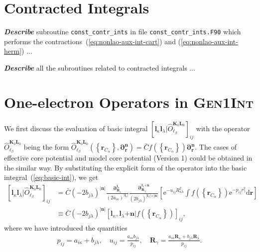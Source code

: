 \documentclass[a4paper,11pt,twoside,openright]{book}
\newcommand{\fixme}[1]{\textbf{\textit{\color{red} #1}}}
\begin{document}
\section{Contracted Integrals}
\label{sect:contr-ints}

\fixme{Describe} subroutine \verb|const_contr_ints| in file \verb|const_contr_ints.F90| which performs the
contractions~(\ref{eq:nonlao-aux-int-cart}) and (\ref{eq:nonlao-aux-int-herm}) ...

\fixme{Describe} all the subroutines related to contracted integrals ...

\section{One-electron Operators in \textsc{Gen1Int}}
\label{sect:operators}

We first discuss the evaluation of basic integral $\left[\boldsymbol{l}_{\kappa}\boldsymbol{l}_{\lambda}\Big|%
\hat{O}_{\ell_{\beta}}^{\boldsymbol{K}_{0}\boldsymbol{L}_{0}}\right]_{ij}$ with the operator
$\hat{O}_{\ell_{\beta}}^{\boldsymbol{K}_{0}\boldsymbol{L}_{0}}$ being the form
$\hat{O}_{\ell_{\beta}}^{\boldsymbol{K}_{0}\boldsymbol{L}_{0}}%
\left(\left\{\boldsymbol{r}_{C_{\alpha}}\right\},\boldsymbol{\partial_{r}^{n}}\right)
=\bar{C}f\left(\left\{\boldsymbol{r}_{C_{\alpha}}\right\}\right)\boldsymbol{\partial}_{\boldsymbol{r}}^{\boldsymbol{n}}$.
The cases of effective core potential and model core potential (Version 1) could be
obtained in the similar way. By substituting the explicit form of the operator into the basic integral~(\ref{eq:basic-int}),
we get~\cite{Gao:IJQC:2010,bgkrth-a,bgkr}
\begin{align}
  \left[\boldsymbol{l}_{\kappa}\boldsymbol{l}_{\lambda}\Big|%
    \hat{O}_{\ell_{\beta}}^{\boldsymbol{K}_{0}\boldsymbol{L}_{0}}\right]_{ij}
  &=\bar{C}(-2b_{j\lambda})^{|\boldsymbol{n}|}%
    \frac{\boldsymbol{\partial}_{\boldsymbol{R}_{\kappa}}^{\boldsymbol{l}_{\kappa}}}%
      {(2a_{i\kappa})^{|\boldsymbol{l}_{\kappa}|}}%
    \frac{\boldsymbol{\partial}_{\boldsymbol{R}_{\lambda}}^{\boldsymbol{l}_{\lambda}\mathrm{+}\boldsymbol{n}}}%
      {(2b_{j\lambda})^{|\boldsymbol{l}_{\lambda}|\mathrm{+}|\boldsymbol{n}|}}%
    \left[\mathrm{e}^{-u_{ij}R_{\kappa\lambda}^2}\int%
      f\left(\left\{\boldsymbol{r}_{C_{\alpha}}\right\}\right)%
        \mathrm{e}^{-p_{ij}r_{\gamma}^2}\mathrm{d}\boldsymbol{r}\right]\\
  &\equiv\bar{C}(-2b_{j\lambda})^{|\boldsymbol{n}|}%
    \left[\boldsymbol{l}_{\kappa},\boldsymbol{l}_{\lambda}\mathrm{+}\boldsymbol{n}%
      \Big|f\left(\left\{\boldsymbol{r}_{C_{\alpha}}\right\}\right)\right]_{ij},\nonumber
\end{align}
where we have introduced the quantities 
\begin{align}
  \label{eq:prule}
  p_{ij}=a_{i\kappa}+b_{j\lambda}, \quad
  u_{ij}=\frac{a_{i\kappa}b_{j\lambda}}{p_{ij}}, \quad
  \boldsymbol{R}_{\gamma}=\frac{a_{i\kappa}\boldsymbol{R}_{\kappa}+b_{j\lambda}\boldsymbol{R}_{\lambda}}{p_{ij}}.
\end{align}
\end{document}
